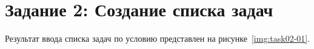 \section{Задание 2: Создание списка задач}

Результат ввода списка задач по условию представлен на
рисунке~\ref{img:task02-01}.

